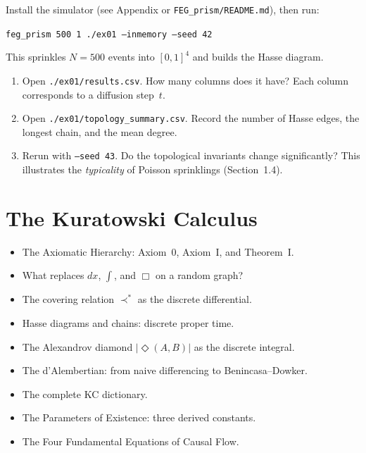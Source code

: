 \documentclass[11pt, a4paper, openany]{book}
\newcommand{\covers}{\prec^*}              %
\newcommand{\diam}[2]{|\Diamond(#1,#2)|}   %
\newenvironment{introduction}[1][Modulo Overview]{%
  \begin{tcolorbox}[
    enhanced,colback=structure!5,colframe=structure,
    colbacktitle=structure,coltitle=white,
    fonttitle=\small\bfseries,title={#1},
    arc=2pt,boxrule=0.7pt,
    left=8pt,right=8pt,top=6pt,bottom=6pt,
    before skip=12pt,after skip=12pt
  ]\itshape\begin{itemize}[leftmargin=*,itemsep=2pt,parsep=0pt]
}{%
  \end{itemize}\end{tcolorbox}
}
\begin{document}
\begin{simulation}
Install the simulator (see Appendix or \texttt{FEG\_prism/README.md}), then run:

\smallskip
\noindent\texttt{feg\_prism 500 1 ./ex01 --inmemory --seed 42}
\smallskip

\noindent This sprinkles $N = 500$ events into $[0,1]^4$ and builds the Hasse diagram.
\begin{enumerate}
\item Open \texttt{./ex01/results.csv}. How many columns does it have? Each column corresponds to a diffusion step~$t$.
\item Open \texttt{./ex01/topology\_summary.csv}. Record the number of Hasse edges, the longest chain, and the mean degree.
\item Rerun with \texttt{--seed 43}. Do the topological invariants change significantly? This illustrates the \emph{typicality} of Poisson sprinklings (Section~1.4).
\end{enumerate}
\end{simulation}


\chapter{The Kuratowski Calculus}\label{ch:kuratowski}

\begin{introduction}
  \item The Axiomatic Hierarchy: Axiom~0, Axiom~I, and Theorem~I.
  \item What replaces $dx$, $\int$, and $\Box$ on a random graph?
  \item The covering relation $\covers$ as the discrete differential.
  \item Hasse diagrams and chains: discrete proper time.
  \item The Alexandrov diamond $\diam{A}{B}$ as the discrete integral.
  \item The d'Alembertian: from naive differencing to Benincasa--Dowker.
  \item The complete KC dictionary.
  \item The Parameters of Existence: three derived constants.
  \item The Four Fundamental Equations of Causal Flow.
\end{introduction}
\end{document}
